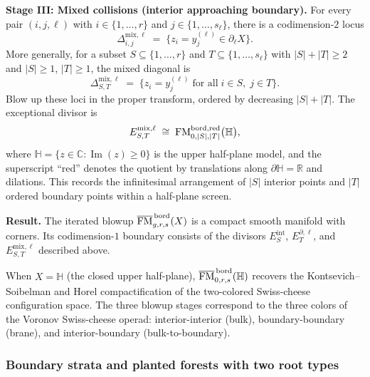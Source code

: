 \begin{construction}
\medskip
\noindent\textbf{Stage III: Mixed collisions (interior approaching
boundary).}
For every pair $(i,j,\ell)$ with $i\in\{1,\dotsc,r\}$ and
$j\in\{1,\dotsc,s_\ell\}$, there is a codimension-$2$ locus
\[
\Delta_{i,j}^{\mathrm{mix},\ell}
\;=\;
\{z_i=y_j^{(\ell)}\in\partial_\ell X\}.
\]
More generally, for a subset $S\subseteq\{1,\dotsc,r\}$ and
$T\subseteq\{1,\dotsc,s_\ell\}$ with $|S|+|T|\ge 2$ and $|S|\ge 1$,
$|T|\ge 1$, the mixed diagonal is
\[
\Delta_{S,T}^{\mathrm{mix},\ell}
\;=\;
\bigl\{z_i=y_j^{(\ell)}\;\text{for all}\;i\in S,\;j\in T\bigr\}.
\]
Blow up these loci in the proper transform, ordered by decreasing
$|S|+|T|$. The exceptional divisor is
\[
E_{S,T}^{\mathrm{mix},\ell}
\;\cong\;
\mathrm{FM}^{\mathrm{bord},\mathrm{red}}_{0,|S|,|T|}
\bigl(\mathbb H\bigr),
\]
where $\mathbb H=\{z\in\mathbb C:\operatorname{Im}(z)\ge 0\}$ is the
upper half-plane model, and the superscript ``red'' denotes the
quotient by translations along $\partial\mathbb H=\mathbb R$ and
dilations. This records the infinitesimal arrangement of $|S|$
interior points and $|T|$ ordered boundary points within a
half-plane screen.

\medskip
\noindent\textbf{Result.}
The iterated blowup
$\overline{\mathrm{FM}}^{\,\mathrm{bord}}_{g,r,s}(X)$ is a compact smooth
manifold with corners. Its codimension-$1$ boundary consists of the
divisors $E_S^{\mathrm{int}}$, $E_T^{\partial,\ell}$, and
$E_{S,T}^{\mathrm{mix},\ell}$ described above.
\end{construction}

\begin{remark}
\label{rem:KS-Horel-comparison}
When $X=\mathbb H$ (the closed upper half-plane),
$\overline{\mathrm{FM}}^{\,\mathrm{bord}}_{0,r,s}(\mathbb H)$ recovers the
Kontsevich--Soibelman \cite{kontsevich-soibelman} and Horel
\cite{horel-swiss-cheese} compactification of the two-colored
Swiss-cheese configuration space. The three blowup stages
correspond to the three colors of the Voronov Swiss-cheese operad:
interior-interior (bulk), boundary-boundary (brane), and
interior-boundary (bulk-to-boundary).
\end{remark}

\subsubsection{Boundary strata and planted forests with two root types}

